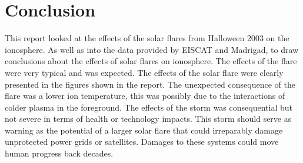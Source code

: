 
\section{Conclusion}

This report looked at the effects of the solar flares from Halloween 2003 on the ionosphere. 
As well as into the data provided by EISCAT and Madrigad, to draw conclusions about the effects of solar flares on ionosphere.
The effects of the flare were very typical and was expected. The effects of the solar flare were clearly presented in the figures shown in the report. The unexpected consequence of the flare was a lower ion temperature, this was possibly due to the interactions of colder plasma in the foreground.
The effects of the storm was consequential but not severe in terms of health or technology impacts. This storm should serve as warning as the potential of a larger solar flare that could irreparably damage unprotected power grids or satellites. Damages to these systems could move human progress back decades.

